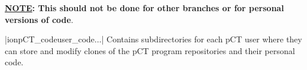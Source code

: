 \begin{tcbenvironment}
\begin{tcbparbox}
\textbf{\ul{NOTE}: This should not be done for other branches or for personal versions of code}.
\end{tcbparbox}
\begin{tcbparbox}|\dirsep ion\dirsep pCT\_code\dirsep user\_code\dirsep{}\dirsep$\dots$|
\bfdash Contains subdirectories for each pCT user where they can store and modify clones of the pCT program repositories and their personal code.
\end{tcbparbox}
\end{tcbenvironment}
\endinput 